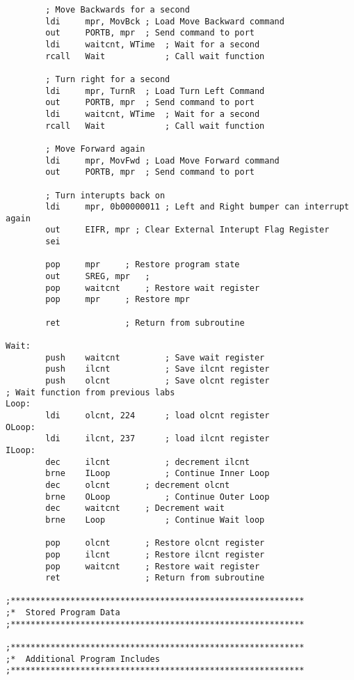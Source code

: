 \documentclass[12pt,letterpaper]{article}
\begin{document}
{\begin{verbatim}
		; Move Backwards for a second
		ldi		mpr, MovBck	; Load Move Backward command
		out		PORTB, mpr	; Send command to port
		ldi		waitcnt, WTime	; Wait for a second
		rcall	Wait			; Call wait function

		; Turn right for a second
		ldi		mpr, TurnR	; Load Turn Left Command
		out		PORTB, mpr	; Send command to port
		ldi		waitcnt, WTime	; Wait for a second
		rcall	Wait			; Call wait function

		; Move Forward again	
		ldi		mpr, MovFwd	; Load Move Forward command
		out		PORTB, mpr	; Send command to port

		; Turn interupts back on
		ldi		mpr, 0b00000011 ; Left and Right bumper can interrupt again
		out 	EIFR, mpr ; Clear External Interupt Flag Register
		sei

		pop		mpr		; Restore program state
		out		SREG, mpr	;
		pop		waitcnt		; Restore wait register
		pop		mpr		; Restore mpr

		ret				; Return from subroutine

Wait:
		push	waitcnt			; Save wait register
		push	ilcnt			; Save ilcnt register
		push	olcnt			; Save olcnt register
; Wait function from previous labs
Loop:	
		ldi		olcnt, 224		; load olcnt register
OLoop:	
		ldi		ilcnt, 237		; load ilcnt register
ILoop:	
		dec		ilcnt			; decrement ilcnt
		brne	ILoop			; Continue Inner Loop
		dec		olcnt		; decrement olcnt
		brne	OLoop			; Continue Outer Loop
		dec		waitcnt		; Decrement wait 
		brne	Loop			; Continue Wait loop	

		pop		olcnt		; Restore olcnt register
		pop		ilcnt		; Restore ilcnt register
		pop		waitcnt		; Restore wait register
		ret					; Return from subroutine

;***********************************************************
;*	Stored Program Data
;***********************************************************

;***********************************************************
;*	Additional Program Includes
;***********************************************************


\end{verbatim}}
\end{document}
